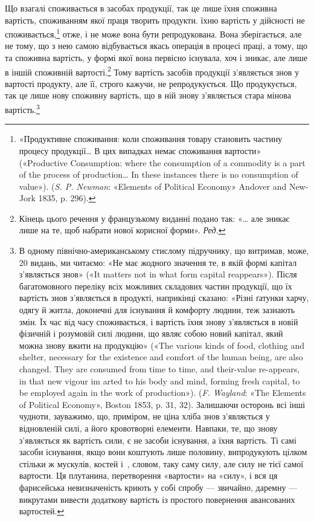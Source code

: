 Що взагалі споживається в засобах продукції, так це лише
їхня споживна вартість, споживанням якої праця творить продукти.
їхню вартість у дійсності не споживається,\footnote{
«Продуктивне споживання: коли споживання товару становить
частину процесу продукції\dots{} В цих випадках немає споживання вартости»
(«Productive Consumption: where the consumption of a commodity is a
part of the process of production\dots{} In these instances there is no consumption
of value»). (\emph{S. P. Newman}: «Elements of Political Economy» Andover
and New-Jork 1835, p. 296).
} отже, і
не може вона бути репродукована. Вона зберігається, але не
тому, що з нею самою відбувається якась операція в процесі
праці, а тому, що та споживна вартість, у формі якої вона первісно
існувала, хоч і зникає, але лише в іншій споживній вартості.\footnote*{
Кінець цього речення у французькому виданні подано так: «\dots{} але
зникає лише на те, щоб набрати нової корисної форми». \emph{Ред.}
}
Тому вартість засобів продукції з’являється знов у вартості
продукту, але її, строго кажучи, не репродукується. Що продукується,
так це лише нову споживну вартість, що в ній знову
з’являється стара мінова вартість.\footnote{
В одному північно-американському стислому підручнику, що витримав,
може, 20 видань, ми читаємо: «Не має жодного значення те, в
якій формі капітал з’являється знов» («It matters not in what form capital
reappears»). Після багатомовного переліку всіх можливих складових
частин продукції, що їх вартість знов з’являється в продукті, наприкінці
сказано: «Різні ґатунки харчу, одягу й житла, доконечні для існування
й комфорту людини, теж зазнають змін. Їх час від часу споживається, і
вартість їхня знову з’являється в новій фізичній і розумовій силі людини, що
являє собою новий капітал, який можна знову вжити на продукцію» («The
various kinds of food, clothing and shelter, necessary for the existence and
comfort of the human being, are also changed. They are consumed from time
to time, and their-value re-appears, in that new vigour im arted to his
body and mind, forming fresh capital, to be employed again in the work
of production»). (\emph{F. Wayland}: «The Elements of Political Economy»,
Boston 1853, p. 31, 32). Залишаючи осторонь всі інші чудноти, зауважимо,
що, приміром, не ціна хліба знов з’являється у відновленій силі,
а його кровотворні елементи. Навпаки, те, що знову з’являється як вартість
сили, є не засоби існування, а їхня вартість. Ті самі засоби існування,
якщо вони коштують лише половину, випродукують цілком стільки ж
мускулів, костей і~, словом, таку саму силу, але силу не тієї самої
вартости. Ця плутанина, перетворення «вартости» на «силу», і вся ця
фарисейська невизначеність криють у собі спробу — звичайно, даремну —
викрутами вивести додаткову вартість із простого повернення авансованих
вартостей.
}

